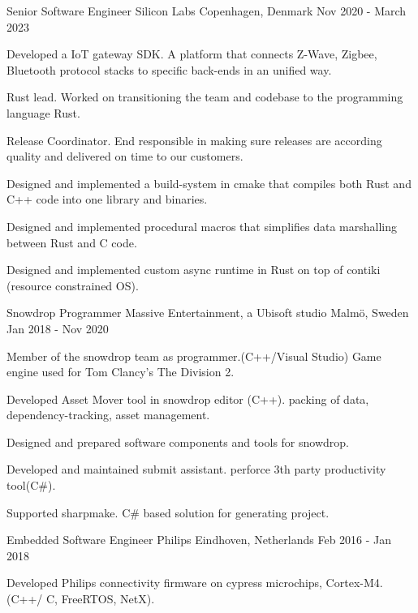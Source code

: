 \begin{cventries}
  \cventry
    {Senior Software Engineer}
    {Silicon Labs}
    {Copenhagen, Denmark}
    {Nov 2020 - March 2023}
    {
      \begin{cvitems}
		\item {Developed a IoT gateway SDK. A platform that connects Z-Wave, Zigbee, Bluetooth protocol stacks to specific back-ends in an unified way.}
		\item {Rust lead. Worked on transitioning the team and codebase to the programming language Rust.}
		\item {Release Coordinator. End responsible in making sure releases are according quality and delivered on time to our customers.}
		\item {Designed and implemented a build-system in cmake that compiles both Rust and C++ code into one library and binaries.}
		\item {Designed and implemented procedural macros that simplifies data marshalling between Rust and C code.}
		\item {Designed and implemented custom async runtime in Rust on top of contiki (resource constrained OS). }
      \end{cvitems}
    }
  \cventry
    {Snowdrop Programmer}
    {Massive Entertainment, a Ubisoft studio}
    {Malmö, Sweden}
    {Jan 2018 - Nov 2020}
    {
      \begin{cvitems}
		\item { Member of the snowdrop team as programmer.(C++/Visual Studio) Game engine used for Tom Clancy's The Division 2. }
        \item { Developed Asset Mover tool in snowdrop editor (C++). packing of data, dependency-tracking, asset management.}
		\item { Designed and prepared software components and tools for snowdrop. }
        \item { Developed and maintained submit assistant. perforce 3th party productivity tool(C\#). }
        \item { Supported sharpmake. C\# based solution for generating project. }
      \end{cvitems}
    }
  \cventry
    {Embedded Software Engineer}
    {Philips}
    {Eindhoven, Netherlands}
    {Feb 2016 - Jan 2018}
    {
      \begin{cvitems}
        \item {Developed Philips connectivity firmware on cypress microchips, Cortex-M4.(C++/ C, FreeRTOS, NetX).}

\end{cvitems}}
\end{cventries}
